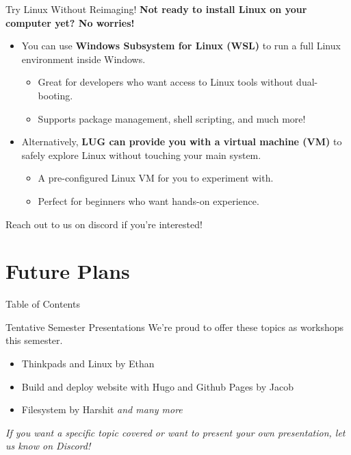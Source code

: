 \documentclass{beamer}
\begin{document}
\begin{frame}{Try Linux Without Reimaging!}
	\textbf{Not ready to install Linux on your computer yet? No worries!}
	\pause
	\begin{itemize}
		\item You can use \textbf{Windows Subsystem for Linux (WSL)} to run a full Linux environment inside Windows.
			\begin{itemize}
				\item Great for developers who want access to Linux tools without dual-booting.
				\item Supports package management, shell scripting, and much more!
			\end{itemize}
		\pause
		\item Alternatively, \textbf{LUG can provide you with a virtual machine (VM)} to safely explore Linux without touching your main system.
			\begin{itemize}
				\item A pre-configured Linux VM for you to experiment with.
				\item Perfect for beginners who want hands-on experience.
			\end{itemize}
		\pause
	\end{itemize}
	Reach out to us on discord if you're interested!
\end{frame}


\section{Future Plans}
\begin{frame}{Table of Contents}
	\tableofcontents[currentsection]
\end{frame}

\begin{frame}{Tentative Semester Presentations}
	We're proud to offer these topics as workshops this semester.
	\pause
	\begin{itemize}
		\item Thinkpads and Linux by Ethan
		\item Build and deploy website with Hugo and Github Pages by Jacob
		\item Filesystem by Harshit
        \textit{and many more}
	\end{itemize}
	\pause
	\textit{If you want a specific topic covered or want to present your
		own presentation, let us know on Discord!}
\end{frame}
\end{document}
